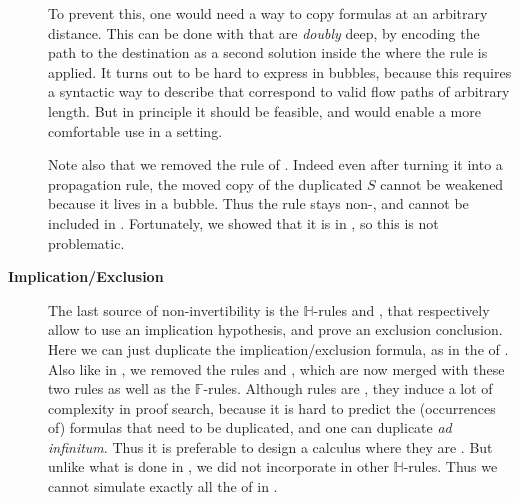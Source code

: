 \begin{description}
    To prevent this, one would need a way to copy formulas at an arbitrary
    distance. This can be done with  that are \emph{doubly} deep,
    by encoding the path to the destination as a second solution  inside
    the  where the rule is applied. It turns out
    to be hard to express in bubbles, because this requires a syntactic way to
    describe  that correspond to valid flow paths of arbitrary
    length. But in
    principle it should be feasible, and would enable a more comfortable use in
    a  setting.

    Note also that we removed the  rule of .
    Indeed even after turning it into a propagation rule, the moved copy of the
    duplicated  $S$ cannot be weakened because it lives in a 
    bubble. Thus the rule stays non-, and cannot be included in
    . Fortunately, we showed that it is  in
    , so this is not problematic.

  \item[\textbf{Implication/Exclusion}]
    The last source of non-invertibility is the $\mathbb{H}$-rules
    \rsf{{\limp}{-}} and \rsf{{\lsub}{+}}, that respectively allow to use an
    implication hypothesis, and prove an exclusion conclusion.
    Here we can just duplicate the implication/exclusion formula, as in the
     of . Also like in , we removed
    the  rules  and , which are now merged with
    these two rules as well as the $\mathbb{F}$-rules. Although 
    rules are , they induce a lot of complexity in proof search,
    because it is hard to predict the (occurrences of) formulas that need to be
    duplicated, and one can duplicate \emph{ad infinitum}. Thus it is preferable
    to design a calculus where they are . But unlike what is done in
    , we did not incorporate  in other
    $\mathbb{H}$-rules. Thus we cannot simulate exactly all the  of  in .

\end{description}

